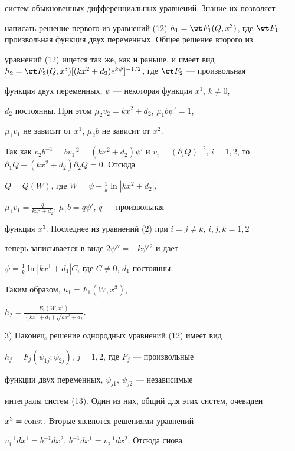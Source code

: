 систем обыкновенных дифференциальных уравнений. Знание их позволяет 


написать решение первого из уравнений (12) $h_1=\wt F_1(Q,x^3)$, где $\wt 


F_1$ --- произвольная функция двух переменных. Общее решение второго из 


уравнений (12) ищется так же, как и раньше, и имеет вид $h_2=\wt 


F_2(Q,x^3)[(kx^2+d_2) e^{k\psi}]^{-1/2}$, где $\wt F_2$ --- произвольная 


функция двух переменных, $\psi$ --- некоторая функция $x^1$, $k\ne0$, 


$d_2$ постоянны. При этом $\mu_2v_2=kx^2+d_2$, $\mu_1b\psi'=1$, 


$\mu_1v_1$ не зависит от $x^1$, $\mu_2b$ не зависит от $x^2$. 


 


Так как $v_2b^{-1}=b v^{-2}_1=(kx^2+d_2)\psi'$ и $v_i=(\partial_i 


Q)^{-2}$, $i=1,2$, то $\partial_1Q+(kx^2+d_2)\partial_2Q=0$. Отсюда 


$Q=Q(W)$, где $W=\psi-\frac{1}{k}\ln|kx^2+d_2|$, 


$\mu_1v_1=\frac{q}{kx^2+d_2}$, $\mu_1b=q\psi'$, $q$ --- произвольная 


функция $x^3$. Последнее из уравнений (2) при $i=j\ne k$, $i,j,k=1,2$ 


теперь записывается в виде $2\psi''=-k\psi'{}^2$ и дает 


$\psi=\frac{1}{k}\ln|kx^1+d_1|C$, где $C\ne0$, $d_1$ постоянны. 


 


Таким образом, $h_1=F_1(W,x^3)$, 


$h_2=\frac{F_2(W,x^3)}{(kx^1+d_1)\sqrt{kx^2+d_2}}$. 


 


3) Наконец, решение однородных уравнений (12) имеет вид 


$h_j=F_j(\psi_{1j};\psi_{2j})$, $j=1,2$, где $F_j$ --- произвольные 


функции двух переменных, $\psi_{j1}$, $\psi_{j2}$ --- независимые 


интегралы систем (13). Один из них, общий для этих систем, очевиден 


$x^3=\operatorname{const}$. Вторые являются решениями уравнений 


$v^{-1}_1dx^1=b^{-1}dx^2$, $b^{-1}dx^1=v^{-1}_2dx^2$. Отсюда снова 


